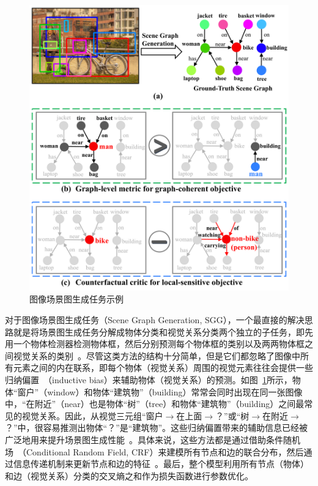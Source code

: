 \begin{figure}[t]
    \centering
    \includegraphics[width=0.9\linewidth]{chapter4/res/sgg.pdf}
    \caption{图像场景图生成任务示例}
    \label{ch4:fig:sgg}
\end{figure}

对于图像场景图生成任务（Scene Graph Generation, SGG），一个最直接的解决思路就是将场景图生成任务分解成物体分类和视觉关系分类两个独立的子任务，即先用一个物体检测器检测物体框，然后分别预测每个物体框的类别以及两两物体框之间视觉关系的类别~\cite{lu2016visual,zhang2017visual,yang2018shuffle}。尽管这类方法的结构十分简单，但是它们都忽略了图像中所有元素之间的内在联系，即每个物体（视觉关系）周围的视觉元素往往会提供一些归纳偏置~\cite{divvala2009empirical}（inductive bias）来辅助物体（视觉关系）的预测。如图~\ref{ch4:fig:sgg}所示，物体“窗户”（window）和物体“建筑物”（building）常常会同时出现在同一张图像中，“在附近”（near）也是物体“树”（tree）和物体“建筑物”（building）之间最常见的视觉关系。因此，从视觉三元组“窗户$\to$在上面$\to$？”或“树$\to$在附近$\to$？”中，很容易推测出物体“？”是“建筑物”。这些归纳偏置带来的辅助信息已经被广泛地用来提升场景图生成性能~\cite{xu2017scene, dai2017detecting, li2017vip, li2017scene, li2018factorizable, yin2018zoom, jae2018tensorize, zellers2018neural, tang2019learning, gu2019scene, qi2019attentive, wang2019exploring, qian2019video}。具体来说，这些方法都是通过借助条件随机场~\cite{zheng2015conditional}（Conditional Random Field, CRF）来建模所有节点和边的联合分布，然后通过信息传递机制来更新节点和边的特征~\cite{krahenbuhl2011efficient}。最后，整个模型利用所有节点（物体）和边（视觉关系）分类的交叉熵之和作为损失函数进行参数优化。

